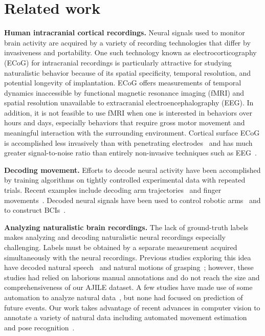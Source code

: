 \documentclass[letterpaper]{article} %
\begin{document}
\section{Related work}

\textbf{Human intracranial cortical recordings.} 
Neural signals used to monitor brain activity are acquired by a variety of recording technologies that differ by invasiveness and portability.
One such technology known as electrocorticography (ECoG) for intracranial recordings is particularly attractive for studying naturalistic behavior because of its spatial specificity, temporal resolution, and potential longevity of implantation.
ECoG offers measurements of temporal dynamics inaccessible by functional magnetic resonance imaging (fMRI) and spatial resolution unavailable to extracranial electroencephalography (EEG).
In addition, it is not feasible to use fMRI when one is interested in behaviors over hours and days, especially behaviors that require gross motor movement and meaningful interaction with the surrounding environment.
Cortical surface ECoG is accomplished less invasively than with penetrating electrodes~\cite{Moran2010,Williams2007} and has much greater signal-to-noise ratio than entirely non-invasive techniques such as EEG~\cite{Lal,Ball2009}.


\textbf{Decoding movement.}
Efforts to decode neural activity have been accomplished by training algorithms on tightly controlled experimental data with repeated trials.
Recent examples include decoding arm trajectories~\cite{Nakanishi2013,Wang2013} and finger movements~\cite{Miller2009,Wang2010}.
Decoded neural signals have been used to control robotic arms~\cite{McMullen2014,Yanagisawa2011,Fifer2014} and to construct BCIs~\cite{Wang2013a,Leuthardt2011,Miller2010,Schalk2008}.

\textbf{Analyzing naturalistic brain recordings.}
The lack of ground-truth labels makes analyzing and decoding naturalistic neural recordings especially challenging.
Labels must be obtained by a separate measurement acquired simultaneously with the neural recordings.
Previous studies exploring this idea have decoded natural speech~\cite{Derix2014,Dastjerdi2013} and natural motions of grasping~\cite{Pistohl2012,Ruescher2013}; however, these studies had relied on laborious manual annotations and do not reach the size and comprehensiveness of our AJILE dataset. 
A few studies have made use of some automation to analyze natural data~\cite{wang2016unsupervised,gabriel2016neural}, but none had focused on prediction of future events. 
Our work takes advantage of recent advances in computer vision to annotate a variety of natural data including automated movement estimation~\cite{Wang2015,Poppe2007} and pose recognition~\cite{Toshev2014,Pfister15a}. 
\end{document}
